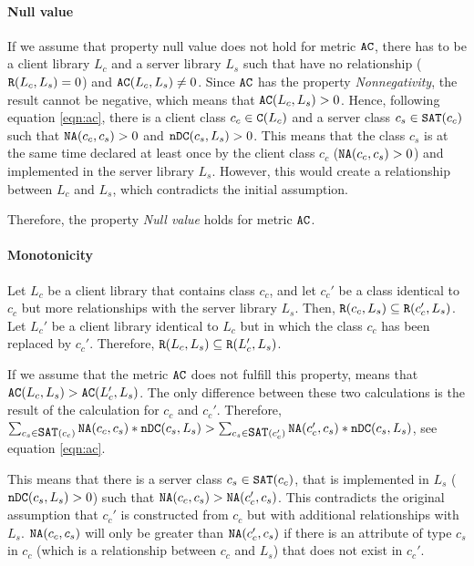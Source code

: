 \paragraph{Null value}
If we assume that property null value does not hold for metric $\verb|AC|$, there has to be a client library $L_c$ and a server library $L_s$ such that have no relationship ($\verb|R|(L_c, L_s) = 0$) and $\verb|AC|(L_c, L_s)	\neq 0$. Since $\verb|AC|$ has the property \textit{Nonnegativity}, the result cannot be negative, which means that $\verb|AC|(L_c, L_s) > 0$. Hence, following equation \ref{eqn:ac}, there is a client class $c_c \in \verb|C|(L_c)$ and a server class $c_s \in \verb|SAT|(c_c)$ such that $\verb|NA|(c_c, c_s) > 0$ and $\verb|nDC|(c_s, L_s) > 0$. This means that the class $c_s$ is at the same time declared at least once by the client class $c_c$ ($\verb|NA|(c_c, c_s) > 0$) and implemented in the server library $L_s$. However, this would create a relationship between $L_c$ and $L_s$, which contradicts the initial assumption.

 Therefore, the property \textit{Null value} holds for metric $\verb|AC|$.

\paragraph{Monotonicity}
Let $L_c$ be a client library that contains class $c_c$, and let $c_c'$ be a class identical to $c_c$ but more relationships with the server library $L_s$. Then, $\verb|R|(c_c, L_s) \subseteq \verb|R|(c_c', L_s)$. Let $L_c'$ be a client library identical to $L_c$ but in which the class $c_c$ has been replaced by $c_c'$. Therefore, $\verb|R|(L_c, L_s) \subseteq \verb|R|(L_c', L_s)$.

If we assume that the metric $\verb|AC|$ does not fulfill this property, means that $\verb|AC|(L_c, L_s) > \verb|AC|(L_c', L_s)$. The only difference between these two calculations is the result of the calculation for $c_c$ and $c_c'$. Therefore, $\sum_{c_s \in \verb|SAT|(c_c)} \verb|NA|(c_c, c_s) * \verb|nDC|(c_s, L_s) > \sum_{c_s \in \verb|SAT|(c_c')} \verb|NA|(c_c', c_s) * \verb|nDC|(c_s, L_s)$, see equation \ref{eqn:ac}.

This means that there is a server class $c_s \in \verb|SAT|(c_c)$, that is implemented in $L_s$ ($\verb|nDC|(c_s, L_s) > 0$) such that $\verb|NA|(c_c, c_s) > \verb|NA|(c_c', c_s)$. This contradicts the original assumption that $c_c'$ is constructed from $c_c$ but with additional relationships with $L_s$. $\verb|NA|(c_c, c_s)$ will only be greater than $\verb|NA|(c_c', c_s)$ if there is an attribute of type $c_s$ in $c_c$ (which is a relationship between $c_c$ and $L_s$) that does not exist in $c_c'$.

